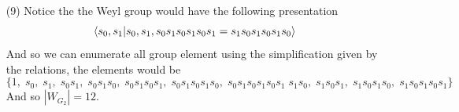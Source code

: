 \documentclass[12pt]{amsart}
\begin{document}
\begin{itemize}
    
    \item[(9)] %
    Notice the the Weyl group would have the following presentation
    \[\left\langle s_0,s_1|s_0,s_1, s_0s_1s_0s_1s_0s_1=s_1s_0s_1s_0s_1s_0 \right\rangle\]
    And so we can enumerate all group element using the simplification given
    by the relations, the elements would be 
    \[\{1,\; s_0,\; s_1,\; s_0s_1,\; s_0s_1s_0,\; s_0s_1s_0s_1,\; s_0s_1s_0s_1s_0,\; s_0s_1s_0s_1s_0s_1\;
    s_1s_0,\; s_1s_0s_1,\; s_1s_0s_1s_0,\; s_1s_0s_1s_0s_1\}\]
    And so $|W_{G_2}|=12$.
\end{itemize}
\end{document}
